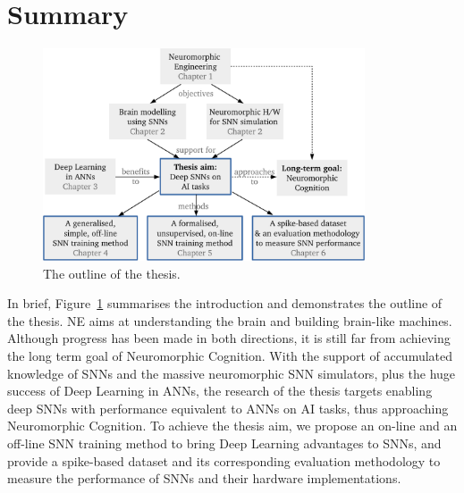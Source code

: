 \section{Summary}
	\begin{figure}[tbh!]
		\centering
		\includegraphics[width=0.85\textwidth]{pics_intro/intro_new.pdf}
		\caption{
			The outline of the thesis.
		}
		\label{fig:intro}
	\end{figure}
	
	In brief, Figure~\ref{fig:intro} summarises the introduction and demonstrates the outline of the thesis.
	NE aims at understanding the brain and building brain-like machines.
	Although progress has been made in both directions, it is still far from achieving the long term goal of Neuromorphic Cognition.
	With the support of accumulated knowledge of SNNs and the massive neuromorphic SNN simulators, plus the huge success of Deep Learning in ANNs, the research of the thesis targets enabling deep SNNs with performance equivalent to ANNs on AI tasks, thus approaching Neuromorphic Cognition.
	To achieve the thesis aim, we propose an on-line and an off-line SNN training method to bring Deep Learning advantages to SNNs, and provide a spike-based dataset and its corresponding evaluation methodology to measure the performance of SNNs and their hardware implementations.
